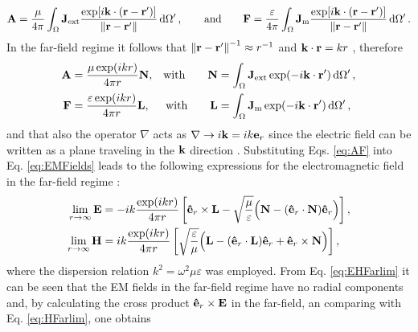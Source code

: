 %
\begin{align}
    \vb{A} = \frac{\mu}{4\pi} \int_\Omega \vb{J}_\text{ext}  \frac{\exp[i\vb{k}\cdot(\vb{r}-\vb{r}')]}{\norm{\vb{r}-\vb{r}'}}\dd{\Omega'},
    \qquad
    \text{and}
    \qquad
    \vb{F} = \frac{\varepsilon}{4\pi} \int_\Omega \vb{J}_\text{m}  \frac{\exp[i\vb{k}\cdot(\vb{r}-\vb{r}')]}{\norm{\vb{r}-\vb{r}'}}\dd{\Omega'}.
\end{align}
%
In the far-field regime it follows that $\norm{\vb{r}-\vb{r}'}^{-1}\approx r^{-1}$ and $\vb{k}\cdot \vb{r} = kr$ \cite{jackson_classical_1999,zangwill_modern_2013}, therefore
%
\begin{subequations}
    \label{eq:AF}
\begin{align}
    \vb{A} &= \frac{\mu\exp(ikr)}{4\pi r}\vb{N},         &\text{with} \qquad \vb{N} &= \int_\Omega \vb{J}_\text{ext}  \exp(-i\vb{k}\cdot\vb{r}')\dd{\Omega'},\\
    \vb{F} &= \frac{\varepsilon\exp(ikr)}{4\pi r}\vb{L}, &\text{with} \qquad \vb{L} &= \int_\Omega \vb{J}_\text{m}  \exp(-i\vb{k}\cdot\vb{r}')\dd{\Omega'},
\end{align}
\end{subequations}
%
and that also the operator $\nabla$ acts as $\nabla\to i\vb{k} = ik\vb{e}_r$ since the electric field can be written as a plane traveling in the $\vb{k}$ direction \cite{jin_theory_2010,jackson_classical_1999}. Substituting Eqs. \eqref{eq:AF} into Eq. \eqref{eq:EMFields} leads to the following expressions for the electromagnetic field in the far-field regime \cite{jin_theory_2010}:
%
\begin{subequations}
    \label{eq:EHFarlim}
\begin{align}
    \lim_{r\to\infty}\vb{E} &= -i k\frac{\exp(ikr)}{4\pi r}
                \left[ \vu{e}_r\times\vb{L}-\sqrt{\frac{\mu}{\varepsilon}}  \Big(\vb{N}-(\vu{e}_r\cdot\vb{N})\vu{e}_r\Big) \right],
            \label{eq:EFarlim}\\
    \lim_{r\to\infty}\vb{H} &=i k\frac{\exp(ikr)}{4\pi r}
                \left[\sqrt{\frac{\varepsilon}{\mu}}  \Big(\vb{L}-(\vu{e}_r\cdot\vb{L})\vu{e}_r + \vu{e}_r\times\vb{N}\Big) \right],
             \label{eq:HFarlim}
\end{align}
\end{subequations}
%
where the dispersion relation $k^2 = \omega^2\mu\varepsilon$ was employed. From Eq. \eqref{eq:EHFarlim} it can be seen that the EM fields in the far-field regime have no radial components and, by calculating the cross product $\vu{e}_r\times\vb{E}$ in the far-field, an comparing with Eq. \eqref{eq:HFarlim}, one obtains
